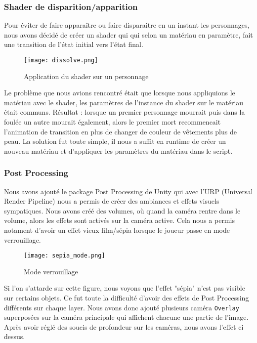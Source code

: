 \subsubsection{Shader de disparition/apparition}
Pour éviter de faire apparaître ou faire disparaitre en un instant les personnages, nous avons décidé de créer un shader qui qui selon un matériau en paramètre, 
fait une transition de l'état initial vers l'état final. 
\begin{figure}[hbt!]
    \centering
    \texttt{[image: dissolve.png]}
    \caption{Application du shader sur un personnage}

\end{figure}
\FloatBarrier

Le problème que nous avions rencontré était que lorsque nous appliquions le matériau avec le shader,
les paramètres de l'instance du shader sur le matériau était communs. Résultat : lorsque un premier personnage mourrait puis dans la foulée un autre mourait également,
alors le premier mort recommencait l'animation de transition en plus de changer de couleur de vêtements plus de peau.
La solution fut toute simple, il nous a suffit en runtime de créer un nouveau matériau et d'appliquer les paramètres du matériau dans le script.



\subsubsection{Post Processing}

Nous avons ajouté le package Post Processing de Unity qui avec l'URP (Universal Render Pipeline)
nous a permis de créer des ambiances et effets visuels sympatiques.
Nous avons créé des volumes, où quand la caméra rentre dans le volume, alors les effets sont activés sur la caméra active.
Cela nous a permis notament d'avoir un effet vieux film/sépia lorsque le joueur passe en mode verrouillage.

\begin{figure}[hbt!]
    \centering
    \texttt{[image: sepia\_mode.png]}
    \caption{Mode verrouillage}
\end{figure}
\FloatBarrier


Si l'on s'attarde sur cette figure, nous voyons que l'effet "sépia" n'est pas visible sur certains objets.
Ce fut toute la difficulté d'avoir des effets de Post Processing différents sur chaque layer.
Nous avons donc ajouté plusieurs caméra \texttt{Overlay} superposées sur la caméra principale qui affichent chacune une partie de l'image.
Après avoir réglé des soucis de profondeur sur les caméras, nous avons l'effet ci dessus.